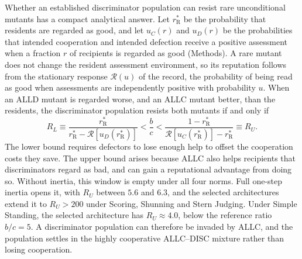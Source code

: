 \documentclass[fleqn,10pt]{article}
\begin{document}
Whether an established discriminator population can resist rare unconditional mutants has a compact analytical answer. Let $r_{\mathrm R}^*$ be the probability that residents are regarded as good, and let $u_C(r)$ and $u_D(r)$ be the probabilities that intended cooperation and intended defection receive a positive assessment when a fraction $r$ of recipients is regarded as good (Methods). A rare mutant does not change the resident assessment environment, so its reputation follows from the stationary response $\mathcal R(u)$ of the record, the probability of being read as good when assessments are independently positive with probability $u$. When an ALLD mutant is regarded worse, and an ALLC mutant better, than the residents, the discriminator population resists both mutants if and only if
\begin{equation}
R_L\equiv\frac{r_{\mathrm R}^{*}}
{r_{\mathrm R}^{*}-\mathcal R\!\left[u_D(r_{\mathrm R}^{*})\right]}
<\frac bc<
\frac{1-r_{\mathrm R}^{*}}
{\mathcal R\!\left[u_C(r_{\mathrm R}^{*})\right]-r_{\mathrm R}^{*}}
\equiv R_U.
\label{eq:canonical-window}
\end{equation}
The lower bound requires defectors to lose enough help to offset the cooperation costs they save. The upper bound arises because ALLC also helps recipients that discriminators regard as bad, and can gain a reputational advantage from doing so. Without inertia, this window is empty under all four norms. Full one-step inertia opens it, with $R_U$ between $5.6$ and $6.3$, and the selected architectures extend it to $R_U>200$ under Scoring, Shunning and Stern Judging. Under Simple Standing, the selected architecture has $R_U\approx4.0$, below the reference ratio $b/c=5$. A discriminator population can therefore be invaded by ALLC, and the population settles in the highly cooperative ALLC--DISC mixture rather than losing cooperation.
\end{document}

